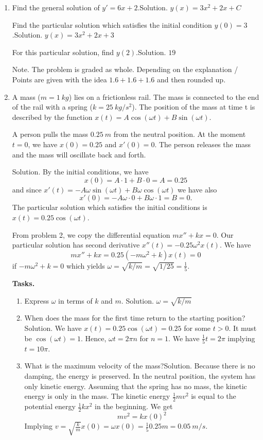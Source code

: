 \documentclass[12pt]{article}
\newcommand{\ratkaisu}[1]{{\color{blue}\quad\textrm{Solution. } #1}}
\newcommand{\huomautus}[1]{{\color{magenta}\quad\textrm{Note. } #1}}
\begin{document}
\begin{enumerate}
\begin{enumerate}
\end{enumerate}

\item Find the general solution of $y'=6x+2$.\ratkaisu{$y(x)=3x^2+2x+C$}

Find the particular solution which satisfies the initial condition $y(0)=3$.\ratkaisu{$y(x)=3x^2+2x+3$}

For this particular solution, find $y(2)$.\ratkaisu{$19$}

\huomautus{The problem is graded as whole. Depending on the explanation / Points are given with the idea $1.6+1.6+1.6$ and then rounded up.}

\item A mass ($m=1~kg$) lies on a frictionless rail. The mass is connected to the end of the rail with a spring ($k=25~kg/s^2$). The position of the mass at time t is described by the function
$x(t)=A\cos(\omega t)+B\sin(\omega t)$.

A person pulls the mass $0.25~m$ from the neutral position. At the moment $t=0$, we have $x(0)=0.25$ and $x'(0)=0$. The person releases the mass and the mass will oscillate back and forth.

\ratkaisu{By the initial conditions, we have
$$
x(0)=A\cdot 1+B\cdot 0=A=0.25
$$
and since $x'(t)=-A\omega\sin(\omega t)+B\omega\cos(\omega t)$ we have also
$$
x'(0)=-A\omega\cdot 0+B\omega\cdot 1=B=0.
$$
The particular solution which satisfies the initial conditions is $x(t)=0.25\cos(\omega t)$.

From problem 2, we copy the differential equation $mx''+kx=0$. Our particular solution has second derivative $x''(t)=-0.25\omega^2 x(t)$. We have
$$
mx''+kx=0.25(-m\omega^2+k)x(t)=0
$$
if $-m\omega^2+k=0$ which yields $\omega=\sqrt{k/m}=\sqrt{1/25}=\frac15$.
}

\textbf{Tasks.}
\begin{enumerate}
\item Express $\omega$ in terms of $k$ and $m$. \ratkaisu{$\omega=\sqrt{k/m}$}
\item When does the mass for the first time return to the starting position?
\ratkaisu{We have $x(t)=0.25\cos(\omega t)=0.25$ for some $t>0$. It must be $\cos(\omega t)=1$. Hence, $\omega t=2\pi n$ for $n=1$. We have $\frac15 t=2\pi$ implying $t=10\pi$.}
\item What is the maximum velocity of the mass?\ratkaisu{Because there is no damping, the energy is preserved. In the neutral position, the system has only kinetic energy. Assuming that the spring has no mass, the kinetic energy is only in the mass. The kinetic energy $\frac12 mv^2$ is equal to the potential energy $\frac12 kx^2$ in the beginning. We get
$$
mv^2=kx(0)^2
$$
Implying
$v=\sqrt{\frac{k}{m}}x(0)=\omega x(0)=\frac15 0.25m=0.05~m/s$.
}


\end{enumerate}
\end{enumerate}
\end{document}
